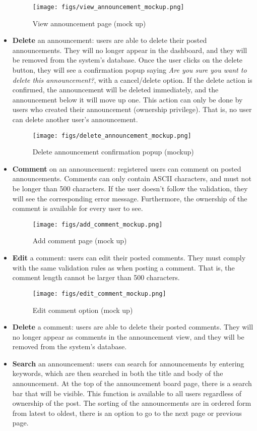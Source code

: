 \documentclass[conference]{IEEEtran}
\begin{document}
\begin{itemize}
\begin{figure}[H]
    \texttt{[image: figs/view\_announcement\_mockup.png]}
    \caption{View announcement page (mock up)}
    \label{fig:View announcement mockup}
    \end{figure}
    \item \textbf{Delete} an announcement:  users are able to delete their posted announcements. They will no longer appear in the dashboard, and they will be removed from the system’s database. Once the user clicks on the delete button, they will see a confirmation popup saying \textit{Are you sure you want to delete this announcement?}, with a cancel/delete option. If the delete action is confirmed,  the announcement will be deleted immediately, and the announcement below it will move up one. This action can only be done by users who created their announcement (ownership privilege). That is, no user can delete another user's announcement.
    \begin{figure}[H]
    \centering
    \texttt{[image: figs/delete\_announcement\_mockup.png]}
    \caption{Delete announcement confirmation popup (mockup)}
    \label{fig:Delete announcement confirmation mockup}
    \end{figure}
    \item \textbf{Comment} on an announcement: registered users can comment on posted announcements. Comments can only contain ASCII characters, and must not be longer than 500 characters. If the user doesn’t follow the validation, they will see the corresponding error message. Furthermore, the ownership of the comment is available for every user to see.
    \begin{figure}[H]
    \centering
    \texttt{[image: figs/add\_comment\_mockup.png]}
    \caption{Add comment page (mock up)}
    \label{fig:Add commment mockup}
    \end{figure}
    \item \textbf{Edit} a comment: users can edit their posted comments. They must comply with the same validation rules as when posting a comment. That is, the comment length cannot be larger than 500 characters.
    \begin{figure}[H]
    \centering
    \texttt{[image: figs/edit\_comment\_mockup.png]}
    \caption{Edit comment option (mock up)}
    \label{fig:Edit commment mockup}
    \end{figure}
    \item \textbf{Delete} a comment: users are able to delete their posted comments. They will no longer appear as comments in the announcement view, and they will be removed from the system’s database.
    \item \textbf{Search} an announcement: users can search for announcements by entering keywords, which are then searched in both the title and body of the announcement. At the top of the announcement board page, there is a search bar that will be visible. This function is available to all users regardless of ownership of the post. The sorting of the announcements are in ordered form from latest to oldest, there is an option to go to the next page or previous page.
\end{itemize}
\end{document}
